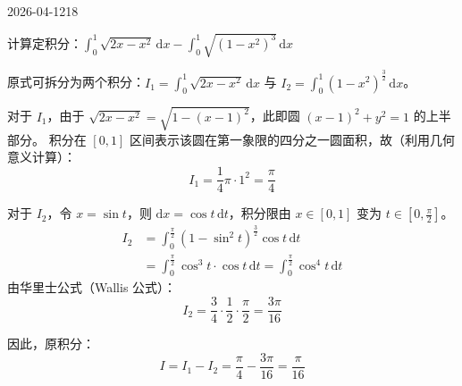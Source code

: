 \begin{mistake}{2026-04-12}{18}

\begin{problemcontent}
计算定积分：\(\displaystyle \int_{0}^{1} \sqrt{2x - x^2} \,\mathrm{d}x - \int_{0}^{1} \sqrt{(1 - x^2)^3} \,\mathrm{d}x\)
\end{problemcontent}

\begin{solutioncontent}
原式可拆分为两个积分：\(I_1 = \int_{0}^{1} \sqrt{2x - x^2} \,\mathrm{d}x\) 与 \(I_2 = \int_{0}^{1} (1 - x^2)^{\frac{3}{2}} \,\mathrm{d}x\)。

对于 \(I_1\)，由于 \(\sqrt{2x - x^2} = \sqrt{1 - (x-1)^2}\)，此即圆 \((x-1)^2 + y^2 = 1\) 的上半部分。
积分在 \([0, 1]\) 区间表示该圆在第一象限的四分之一圆面积，故（利用几何意义计算）：
\[
I_1 = \frac{1}{4} \pi \cdot 1^2 = \frac{\pi}{4}
\]

对于 \(I_2\)，令 \(x = \sin t\)，则 \(\mathrm{d}x = \cos t \,\mathrm{d}t\)，积分限由 \(x \in [0, 1]\) 变为 \(t \in [0, \frac{\pi}{2}]\)。
\[
\begin{aligned}
I_2 &= \int_{0}^{\frac{\pi}{2}} (1 - \sin^2 t)^{\frac{3}{2}} \cos t \,\mathrm{d}t \\
&= \int_{0}^{\frac{\pi}{2}} \cos^3 t \cdot \cos t \,\mathrm{d}t = \int_{0}^{\frac{\pi}{2}} \cos^4 t \,\mathrm{d}t
\end{aligned}
\]
由华里士公式（Wallis 公式）：
\[
I_2 = \frac{3}{4} \cdot \frac{1}{2} \cdot \frac{\pi}{2} = \frac{3\pi}{16}
\]

因此，原积分：
\[
I = I_1 - I_2 = \frac{\pi}{4} - \frac{3\pi}{16} = \frac{\pi}{16}
\]
\end{solutioncontent}


\end{mistake}
